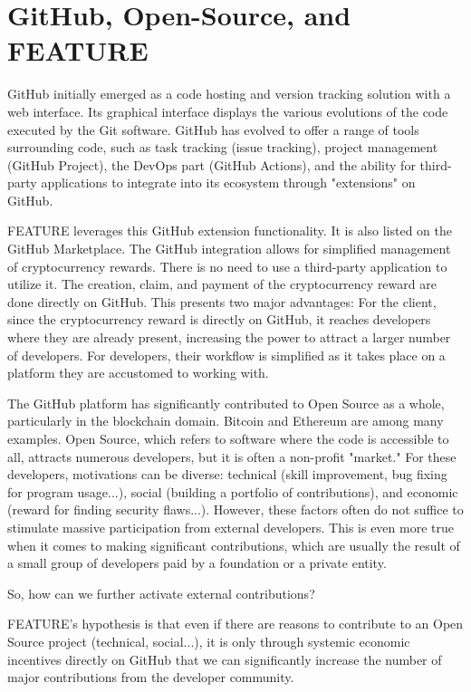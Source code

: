 \documentclass[
	a4paper, %
	10pt, %
	unnumberedsections, %
	twoside, %
]{LTJournalArticle}
\begin{document}

\section{GitHub, Open-Source, and FEATURE}

GitHub initially emerged as a code hosting and version tracking solution with a web interface. Its graphical interface displays the various evolutions of the code executed by the Git software. GitHub has evolved to offer a range of tools surrounding code, such as task tracking (issue tracking), project management (GitHub Project), the DevOps part (GitHub Actions), and the ability for third-party applications to integrate into its ecosystem through "extensions" on GitHub.

FEATURE leverages this GitHub extension functionality. It is also listed on the GitHub Marketplace. The GitHub integration allows for simplified management of cryptocurrency rewards. There is no need to use a third-party application to utilize it. The creation, claim, and payment of the cryptocurrency reward are done directly on GitHub. This presents two major advantages: For the client, since the cryptocurrency reward is directly on GitHub, it reaches developers where they are already present, increasing the power to attract a larger number of developers. For developers, their workflow is simplified as it takes place on a platform they are accustomed to working with.

The GitHub platform has significantly contributed to Open Source as a whole, particularly in the blockchain domain. Bitcoin and Ethereum are among many examples. Open Source, which refers to software where the code is accessible to all, attracts numerous developers, but it is often a non-profit "market." For these developers, motivations can be diverse: technical (skill improvement, bug fixing for program usage...), social (building a portfolio of contributions), and economic (reward for finding security flaws...). However, these factors often do not suffice to stimulate massive participation from external developers. This is even more true when it comes to making significant contributions, which are usually the result of a small group of developers paid by a foundation or a private entity.

So, how can we further activate external contributions?

FEATURE's hypothesis is that even if there are reasons to contribute to an Open Source project (technical, social...), it is only through systemic economic incentives directly on GitHub that we can significantly increase the number of major contributions from the developer community.
\end{document}
